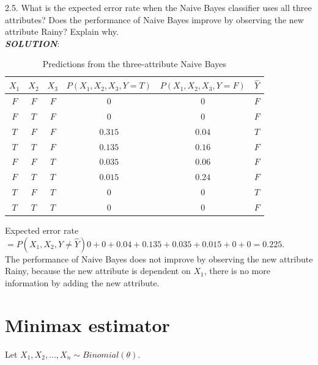 \documentclass{article}
\theoremstyle{definition}
\theoremstyle{definition}
\theoremstyle{remark}
\begin{document}
2.5. What is the expected error rate when the Naive Bayes classifier uses all three attributes? Does
the performance of Naive Bayes improve by observing the new attribute Rainy? Explain why.\\
\emph{\textbf{SOLUTION}}:\\
\begin{table}[!htbp]
\centering
\begin{tabular}{|c|c|c|c|c|c|}
\hline
 $X_1$& $X_2$ & $X_3$ & $P(X_1,X_2,X_3,Y=T)$ &$ P(X_1,X_2,X_3,Y=F)$ &$ \hat{Y}$ \\
\hline
$F$ & $F$ & $F$ & $0$ & $0$& $F$\\
\hline
$F$ & $T$ & $F$ & $0$ & $0$ & $F$ \\
\hline
$T$ & $F$ & $F$ & $0.315$ & $0.04$& $T$\\
\hline
$T$ & $T$ & $F$ & $0.135$ & $0.16$ & $F$ \\
\hline
$F$ & $F$ & $T$ &$0.035$ & $0.06$& $F$\\
\hline
$F$ & $T$ & $T$ & $0.015$ & $0.24$ & $F$ \\
\hline
$T$ & $F$ & $T$ &$0$ & $0$& $T$\\
\hline
$T$ & $T$ & $T$ &$0$ & $0$ & $F$ \\
\hline
\end{tabular}
\caption{Predictions from the three-attribute Naive Bayes}
\end{table}
Expected error rate$ =P(X_1,X_2,Y\neq\hat{Y}) 0+0+0.04+0.135+0.035+0.015+0+0 = 0.225$.\\
The performance of Naive Bayes does not improve by observing the new attribute Rainy, because the new attribute is
dependent on $X_1$, there is no more information by adding the new attribute.


\section*{Minimax estimator}
Let $X_1,X_2,...,X_n\sim Binomial(\theta).$
\end{document}
